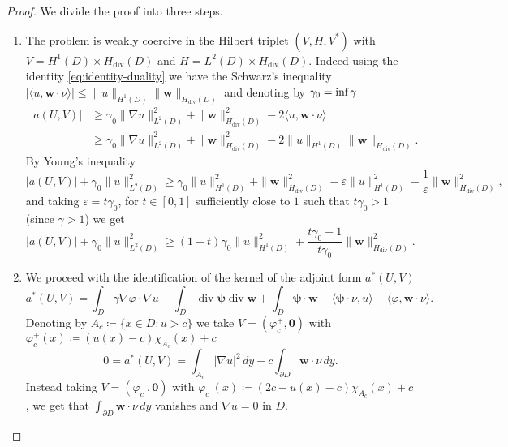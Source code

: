 \documentclass[10pt, a4paper, twoside, openright]{book}
\theoremstyle{definition}
\theoremstyle{plain}
\theoremstyle{plain}
\theoremstyle{plain}
\theoremstyle{plain}
\theoremstyle{plain}
\theoremstyle{plain}
\theoremstyle{plain}
\theoremstyle{plain}
\DeclareMathOperator{\divergence}{div}
\let\phi\varphi
\let\epsilon\varepsilon
\begin{document}
\begin{proof}
We divide the proof into three steps.
 \begin{enumerate}
 \item 
 The problem is weakly coercive in the Hilbert triplet $(V,H,V^*)$ with $V=H^1(D)\times H_{\divergence}(D)$ and $H=L^2(D)\times H_{\divergence}(D)$.
 Indeed using the identity \eqref{eq:identity-duality} we have the Schwarz's inequality $|\langle u ,\bm{w}\cdot\nu\rangle |\leq\|u\|_{H^1(D)}\|\bm{w}\|_{H_{\divergence}(D)}$ and 
 denoting by $\gamma_0 = \textup{inf}\,\gamma$
\begin{align}
 |a(U,V)|&\geq \gamma_0\|\nabla u\|_{L^2(D)}^2 + \|\bm{w}\|^2_{H_{\divergence}(D)}-2\langle u ,\bm{w}\cdot\nu\rangle \\
 &\geq \gamma_0\|\nabla u\|_{L^2(D)}^2 + \|\bm{w}\|^2_{H_{\divergence}(D)}-2\|u\|_{H^1(D)}\|\bm{w}\|_{H_{\divergence}(D)}.
 \end{align}
 By Young's inequality
 \begin{equation}
 |a(U,V)| + \gamma_0\|u\|^2_{L^2(D)} \geq \gamma_0\|u\|_{H^1(D)}^2 + \|\bm{w}\|^2_{H_{\divergence}(D)}-\epsilon\|u\|^2_{H^1(D)} - \frac{1}{\epsilon}\|\bm{w}\|^2_{H_{\divergence}(D)},
 \end{equation}
 and taking $\epsilon=t\gamma_0$, for $t\in[0,1]$ sufficiently close to $1$ such that $t\gamma_0>1$ (since $\gamma>1$) we get
 \begin{equation}
  |a(U,V)| + \gamma_0\|u\|^2_{L^2(D)}\geq (1-t)\gamma_0\|u\|_{H^1(D)}^2 + \frac{t\gamma_0 - 1}{t\gamma_0}\|\bm{w}\|^2_{H_{\divergence}(D)}.
 \end{equation}
 \item We proceed with the identification of the kernel of the adjoint form $a^*(U,V)$
\begin{equation*}
  a^*(U,V)= \int_D \gamma \nabla \phi \cdot\nabla u + \int_D\divergence \bm{\psi}\divergence\bm{w} + \int_D\bm{\psi}\cdot\bm{w} - \langle \bm{\psi}\cdot\nu, u \rangle- \langle \phi,\bm{w}\cdot\nu\rangle.
\end{equation*}
 Denoting by $A_c\coloneqq\{x\in D: u>c\}$ we take $V=(\phi_c^+, \bm{0})$ with $\phi_c^+(x)\coloneqq (u(x)-c)\chi_{A_c}(x) + c$
\begin{equation*}
  0 = a^*(U,V)= \int_{A_c} |\nabla u|^2\,dy - c\int_{\partial D}\bm{w}\cdot\nu\, dy.
\end{equation*}
 Instead taking $V=(\phi_c^-,\bm{0})$ with $\phi_c^-(x)\coloneqq (2c - u(x) - c)\chi_{A_c}(x) + c$, we get that
 $\int_{\partial D}\bm{w}\cdot\nu\,dy$ vanishes and $\nabla u=0$ in $D$. 

\end{enumerate}
\end{proof}
\end{document}
